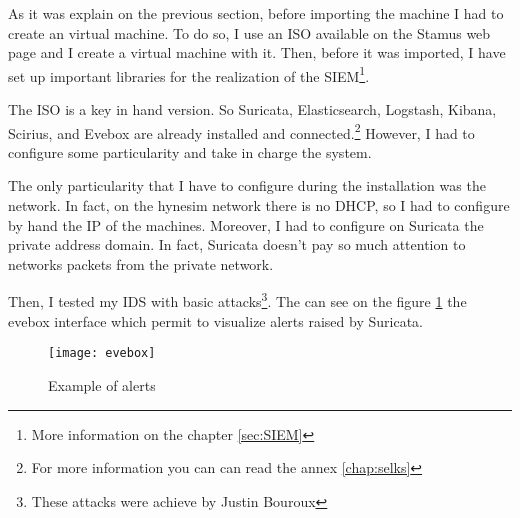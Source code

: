As it was explain on the previous section, before importing the machine I had to create an virtual machine. To do
so, I use an ISO available on the Stamus web page \cite{stamusnetworks:_selks} and I create a virtual machine with
it. Then, before it was imported, I have set up important libraries for the realization of the SIEM\footnote{More
  information on the chapter \ref{sec:SIEM}}.

The ISO is a key in hand version. So Suricata, Elasticsearch, Logstash, Kibana, Scirius, and Evebox are already
installed and connected.\footnote{For more information you can can read the annex \ref{chap:selks}} However, I had
to configure some particularity and take in charge the system.

The only particularity that I have to configure during the installation was the network. In fact, on the hynesim
network there is no DHCP, so I had to configure by hand the IP of the machines. Moreover, I had to configure on
Suricata the private address domain. In fact, Suricata doesn't pay so much attention to networks packets from the
private network.

Then, I tested my IDS with basic attacks\footnote{These attacks were achieve by Justin Bouroux}. The can see on the
figure \ref{fig:evebox} the evebox interface which permit to visualize alerts raised by Suricata.

\begin{figure}[h]
  \centering
  \texttt{[image: evebox]}
  \caption{Example of alerts}
  \label{fig:evebox}
\end{figure}


